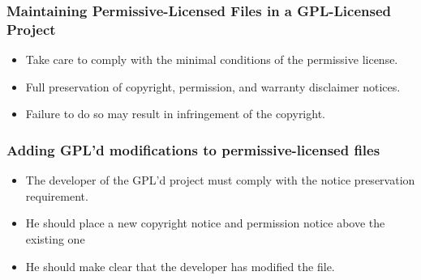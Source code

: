 \documentclass{beamer}
\begin{document}
\begin{frame}
\frametitle{Maintaining Permissive-Licensed Files in a GPL-Licensed Project}

\begin{itemize}
\item Take care to comply with the minimal conditions of the permissive license.
\item Full preservation of copyright, permission, and warranty disclaimer notices.
\item Failure to do so may result in infringement of the copyright.
\end{itemize}
                                                 
\end{frame}

\begin{frame}
\frametitle{Adding GPL'd modifications to permissive-licensed files}

\begin{itemize}
\item The developer of the GPL'd project must comply with the notice preservation requirement.
\item He should place a new copyright notice and permission notice above the existing one 
\item He should make clear that the developer has modified the file.
\end{itemize}
                                                 
\end{frame}

\end{document}
